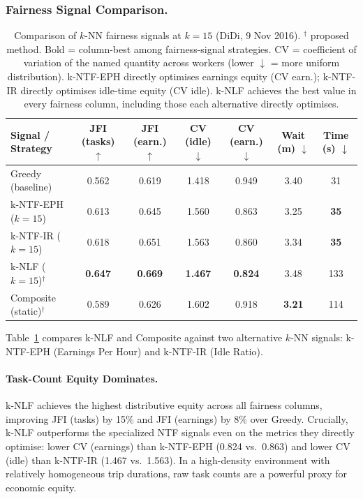 \subsubsection{Fairness Signal Comparison.}
\label{sec:signal_comparison}
\begin{table}[h]
\scriptsize
\renewcommand\arraystretch{1}
\setlength\tabcolsep{2pt}
\caption{Comparison of $k$-NN fairness signals at $k{=}15$ (DiDi, 9 Nov 2016).
  $^\dagger$ proposed method. Bold = column-best among fairness-signal strategies.
  CV = coefficient of variation of the named quantity across workers (lower $\downarrow$ = more uniform distribution).
  k-NTF-EPH directly optimises earnings equity (CV earn.); k-NTF-IR directly optimises idle-time equity (CV idle).
  k-NLF achieves the best value in every fairness column, including those each alternative directly optimises.}
\label{tab:signal_comparison}
\begin{tabular}{@{}l cccc c c@{}}
\toprule
\textbf{Signal / Strategy}
  & \textbf{JFI (tasks)} $\uparrow$
  & \textbf{JFI (earn.)} $\uparrow$
  & \textbf{CV (idle)} $\downarrow$
  & \textbf{CV (earn.)} $\downarrow$
  & \textbf{Wait (m)} $\downarrow$
  & \textbf{Time (s)} $\downarrow$ \\
\midrule
Greedy (baseline)
  & 0.562 & 0.619 & 1.418 & 0.949 & 3.40 & 31 \\
\midrule
k-NTF-EPH ($k{=}15$)
  & 0.613 & 0.645 & 1.560 & 0.863 & 3.25 & \textbf{35} \\
k-NTF-IR ($k{=}15$)
  & 0.618 & 0.651 & 1.563 & 0.860 & 3.34 & \textbf{35} \\
k-NLF ($k{=}15$)$^\dagger$
  & \textbf{0.647} & \textbf{0.669} & \textbf{1.467} & \textbf{0.824} & 3.48 & 133 \\
\midrule
Composite (static)$^\dagger$
  & 0.589 & 0.626 & 1.602 & 0.918 & \textbf{3.21} & 114 \\
\bottomrule
\end{tabular}
\end{table}

Table~\ref{tab:signal_comparison} compares k-NLF and Composite against two alternative $k$-NN signals: k-NTF-EPH (Earnings Per Hour) and k-NTF-IR (Idle Ratio).

\paragraph{Task-Count Equity Dominates.}
k-NLF achieves the highest distributive equity across all fairness columns, improving JFI (tasks) by 15\% and JFI (earnings) by 8\% over Greedy. Crucially, k-NLF outperforms the specialized NTF signals even on the metrics they directly optimise: lower CV (earnings) than k-NTF-EPH (0.824 vs.\ 0.863) and lower CV (idle) than k-NTF-IR (1.467 vs.\ 1.563). In a high-density environment with relatively homogeneous trip durations, raw task counts are a powerful proxy for economic equity.

